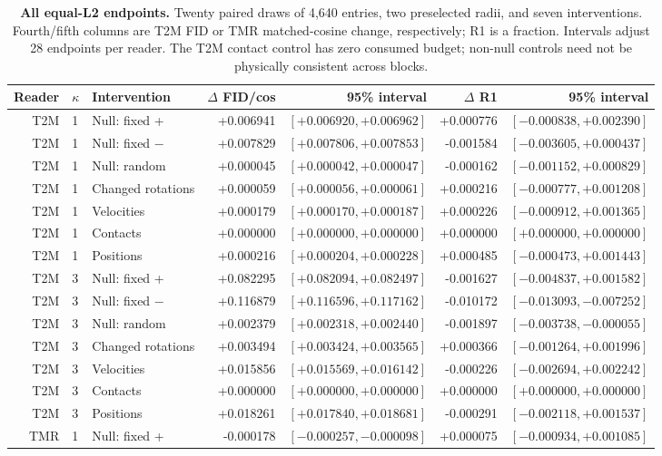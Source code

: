 \begin{table}[t]
\centering\small
\caption{\textbf{All equal-L2 endpoints.} Twenty paired draws of 4,640 entries, two preselected radii, and seven interventions. Fourth/fifth columns are T2M FID or TMR matched-cosine change, respectively; R1 is a fraction. Intervals adjust 28 endpoints per reader. The T2M contact control has zero consumed budget; non-null controls need not be physically consistent across blocks.}\label{tab:matchedfull}
\begin{tabular}{@{}rllrrrr@{}}\toprule
Reader&$\kappa$&Intervention&$\Delta$ FID/cos&95\% interval&$\Delta$ R1&95\% interval\\\midrule
T2M&1&Null: fixed +&+0.006941&$[+0.006920,+0.006962]$&+0.000776&$[-0.000838,+0.002390]$\\
T2M&1&Null: fixed $-$&+0.007829&$[+0.007806,+0.007853]$&-0.001584&$[-0.003605,+0.000437]$\\
T2M&1&Null: random&+0.000045&$[+0.000042,+0.000047]$&-0.000162&$[-0.001152,+0.000829]$\\
T2M&1&Changed rotations&+0.000059&$[+0.000056,+0.000061]$&+0.000216&$[-0.000777,+0.001208]$\\
T2M&1&Velocities&+0.000179&$[+0.000170,+0.000187]$&+0.000226&$[-0.000912,+0.001365]$\\
T2M&1&Contacts&+0.000000&$[+0.000000,+0.000000]$&+0.000000&$[+0.000000,+0.000000]$\\
T2M&1&Positions&+0.000216&$[+0.000204,+0.000228]$&+0.000485&$[-0.000473,+0.001443]$\\
T2M&3&Null: fixed +&+0.082295&$[+0.082094,+0.082497]$&-0.001627&$[-0.004837,+0.001582]$\\
T2M&3&Null: fixed $-$&+0.116879&$[+0.116596,+0.117162]$&-0.010172&$[-0.013093,-0.007252]$\\
T2M&3&Null: random&+0.002379&$[+0.002318,+0.002440]$&-0.001897&$[-0.003738,-0.000055]$\\
T2M&3&Changed rotations&+0.003494&$[+0.003424,+0.003565]$&+0.000366&$[-0.001264,+0.001996]$\\
T2M&3&Velocities&+0.015856&$[+0.015569,+0.016142]$&-0.000226&$[-0.002694,+0.002242]$\\
T2M&3&Contacts&+0.000000&$[+0.000000,+0.000000]$&+0.000000&$[+0.000000,+0.000000]$\\
T2M&3&Positions&+0.018261&$[+0.017840,+0.018681]$&-0.000291&$[-0.002118,+0.001537]$\\
TMR&1&Null: fixed +&-0.000178&$[-0.000257,-0.000098]$&+0.000075&$[-0.000934,+0.001085]$\\

\end{tabular}
\end{table}
